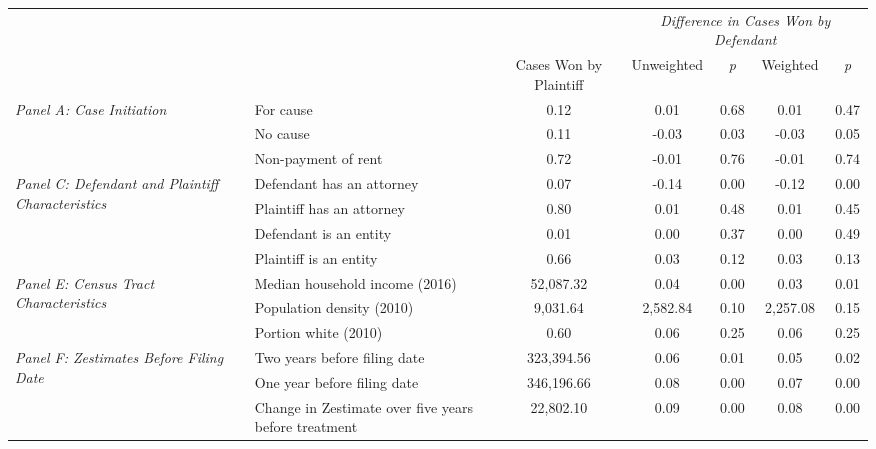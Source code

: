 \begin{tabular}{llccccc}
\toprule
 &  & \textit{} & \multicolumn{4}{c}{\textit{Difference in Cases Won by Defendant}} \\
 &  & Cases Won by Plaintiff & Unweighted & \emph{p} & Weighted & \emph{p} \\
\midrule
\multirow[c]{3}{3cm}{\textit{Panel A: Case Initiation}} & For cause & 0.12 & 0.01 & 0.68 & 0.01 & 0.47 \\
 & No cause & 0.11 & -0.03 & 0.03 & -0.03 & 0.05 \\
 & Non-payment of rent & 0.72 & -0.01 & 0.76 & -0.01 & 0.74 \\
\cline{1-7}
\multirow[c]{4}{3cm}{\textit{Panel C: Defendant and Plaintiff Characteristics}} & Defendant has an attorney & 0.07 & -0.14 & 0.00 & -0.12 & 0.00 \\
 & Plaintiff has an attorney & 0.80 & 0.01 & 0.48 & 0.01 & 0.45 \\
 & Defendant is an entity & 0.01 & 0.00 & 0.37 & 0.00 & 0.49 \\
 & Plaintiff is an entity & 0.66 & 0.03 & 0.12 & 0.03 & 0.13 \\
\cline{1-7}
\multirow[c]{3}{3cm}{\textit{Panel E: Census Tract Characteristics}} & Median household income (2016) & 52,087.32 & 0.04 & 0.00 & 0.03 & 0.01 \\
 & Population density (2010) & 9,031.64 & 2,582.84 & 0.10 & 2,257.08 & 0.15 \\
 & Portion white (2010) & 0.60 & 0.06 & 0.25 & 0.06 & 0.25 \\
\cline{1-7}
\multirow[c]{3}{3cm}{\textit{Panel F: Zestimates Before Filing Date}} & Two years before filing date & 323,394.56 & 0.06 & 0.01 & 0.05 & 0.02 \\
 & One year before filing date & 346,196.66 & 0.08 & 0.00 & 0.07 & 0.00 \\
 & Change in Zestimate over five years before treatment & 22,802.10 & 0.09 & 0.00 & 0.08 & 0.00 \\
\cline{1-7}
\bottomrule
\end{tabular}
